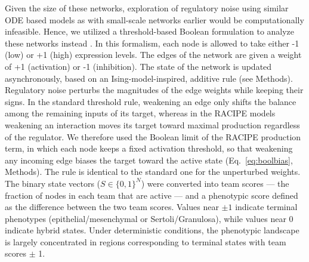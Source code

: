 \documentclass[11pt]{article}
\providecommand{\DIFaddtex}[1]{{\protect\color{red}#1}} %
\providecommand{\DIFdeltex}[1]{} %
\providecommand{\DIFaddbegin}{} %
\providecommand{\DIFaddend}{} %
\providecommand{\DIFdelbegin}{} %
\providecommand{\DIFdelend}{} %
\providecommand{\DIFadd}[1]{\texorpdfstring{\DIFaddtex{#1}}{#1}} %
\providecommand{\DIFdel}[1]{\texorpdfstring{\DIFdeltex{#1}}{}} %
\providecommand{\DIFaddincludegraphics}[2][]{\DIFOincludegraphics[#1]{#2}} %
\providecommand{\DIFdelincludegraphics}[2][]{}
\DeclareRobustCommand{\DIFaddbegin}{\DIFOaddbegin \let\includegraphics\DIFaddincludegraphics} %
\DeclareRobustCommand{\DIFaddend}{\DIFOaddend \let\includegraphics\DIFOincludegraphics} %
\DeclareRobustCommand{\DIFdelbegin}{\DIFOdelbegin \let\includegraphics\DIFdelincludegraphics} %
\DeclareRobustCommand{\DIFdelend}{\DIFOaddend \let\includegraphics\DIFOincludegraphics} %
\begin{document}
Given the size of these networks, exploration of regulatory noise using similar ODE based models as with small-scale networks earlier would be computationally infeasible. Hence, we utilized a threshold-based Boolean formulation to analyze these networks instead \cite{FontClos2018}. In this formalism, each node is allowed to take either -1 (low) or +1 (high) expression levels. The edges of the network are given a weight of +1 (activation) or -1 (inhibition). The state of the network is updated asynchronously, based on an Ising-model-inspired, additive rule (see Methods). \DIFdelbegin \DIFdel{The }\DIFdelend \DIFaddbegin \DIFadd{Regulatory noise perturbs the magnitudes of the edge weights while keeping their signs. In the standard threshold rule, weakening an edge only shifts the balance among the remaining inputs of its target, whereas in the RACIPE models weakening an interaction moves its target toward maximal production regardless of the regulator. We therefore used the Boolean limit of the RACIPE production term, in which each node keeps a fixed activation threshold, so that weakening any incoming edge biases the target toward the active state (Eq.~\ref{eq:boolbias}, Methods). The rule is identical to the standard one for the unperturbed weights. The }\DIFaddend binary state vectors ($S \in \{0, 1\}^N$) were converted into team scores --- the fraction of nodes in each team that are active --- and a phenotypic score defined as the difference between the two team scores. Values near $\pm 1$ indicate terminal phenotypes (epithelial/mesenchymal or Sertoli/Granulosa), while values near 0 indicate hybrid states. Under deterministic conditions, the phenotypic landscape is largely concentrated in regions corresponding to terminal states with team scores $\pm$ 1. 
\end{document}
